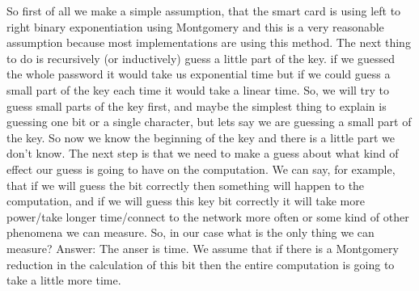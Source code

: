 So first of all we make a simple assumption, that the smart card is using
left to right binary exponentiation using Montgomery and this is a very
reasonable assumption because most implementations are using this method.
The next thing to do is recursively (or inductively) guess a little part of the key.
if we guessed the whole password it would take us exponential time but if 
we could guess a small part of the key each time it would take a linear time. 
So, we will try to guess small parts of the key first, and maybe the simplest thing 
to explain is guessing one bit or a single character, but lets say we are guessing a small part
of the key. So now we know the beginning of the key and there is a little part
we don't know. The next step is that we need to make a guess about what kind of 
effect our guess is going to have on the computation. We can say, for example,
that if we will guess the bit correctly then something will happen to the
computation, and if we will guess this key bit correctly it will take more
power/take longer time/connect to the network more often or some kind of other 
phenomena we can measure. So, in our case what is the only thing we can measure? Answer:
The anser is time. We assume that if there is a Montgomery reduction in the calculation of
this bit then the entire computation is going to take a little more time.


